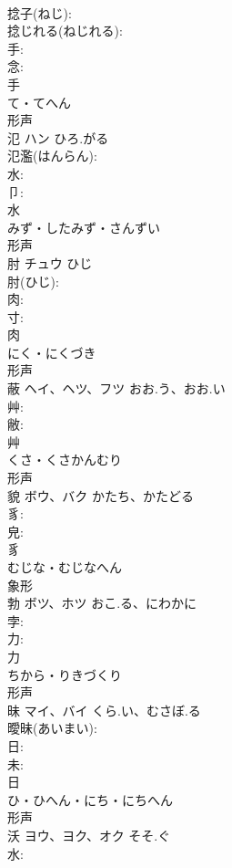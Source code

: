 \documentclass[8pt]{extreport}
\begin{document}
\begin{CJK}{UTF8}{min}
\\	捻子(ねじ): 
\\	捻じれる(ねじれる): 
\\	手: 
\\	念: 
\\	手	
\\	て・てへん	
\\	形声 
\\	氾	ハン	ひろ.がる		
\\	氾濫(はんらん): 
\\	水: 
\\	卩: 
\\	水	
\\	みず・したみず・さんずい	
\\	形声 
\\	肘	チュウ	ひじ		
\\	肘(ひじ): 
\\	肉: 
\\	寸: 
\\	肉	
\\	にく・にくづき	
\\	形声 
\\	蔽	ヘイ、ヘツ、フツ	おお.う、おお.い		
\\	艸: 
\\	敝: 
\\	艸	
\\	くさ・くさかんむり	
\\	形声 
\\	貌	ボウ、バク	かたち、かたどる		
\\	豸: 
\\	皃: 
\\	豸	
\\	むじな・むじなへん	
\\	象形 
\\	勃	ボツ、ホツ	おこ.る、にわかに		
\\	孛: 
\\	力: 
\\	力	
\\	ちから・りきづくり	
\\	形声 
\\	昧	マイ、バイ	くら.い、むさぼ.る		
\\	曖昧(あいまい): 
\\	日: 
\\	未: 
\\	日	
\\	ひ・ひへん・にち・にちへん	
\\	形声 
\\	沃	ヨウ、ヨク、オク	そそ.ぐ		
\\	水: 

\end{CJK}
\end{document}

